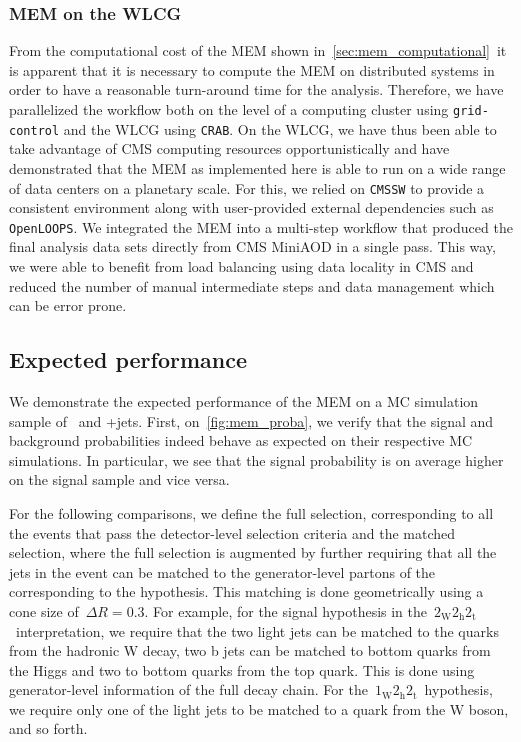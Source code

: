 \subsubsection{MEM on the WLCG}

From the computational cost of the MEM shown in~\cref{sec:mem_computational}~it is apparent that it is necessary to compute the MEM on distributed systems in order to have a reasonable turn-around time for the analysis. Therefore, we have parallelized the workflow both on the level of a computing cluster using \texttt{grid-control} and the WLCG using \texttt{CRAB}. On the WLCG, we have thus been able to take advantage of CMS computing resources opportunistically and have demonstrated that the MEM as implemented here is able to run on a wide range of data centers on a planetary scale. For this, we relied on \texttt{CMSSW} to provide a consistent environment along with user-provided external dependencies such as \texttt{OpenLOOPS}. We integrated the MEM into a multi-step workflow that produced the final analysis data sets directly from CMS MiniAOD in a single pass. This way, we were able to benefit from load balancing using data locality in CMS and reduced the number of manual intermediate steps and data management which can be error prone.

\subsection{Expected performance}
We demonstrate the expected performance of the MEM on a MC simulation sample of \ttH~and \ttbar+jets. First, on~\cref{fig:mem_proba}, we verify that the signal and background probabilities indeed behave as expected on their respective MC simulations. In particular, we see that the signal probability is on average higher on the signal sample and vice versa.

For the following comparisons, we define the full selection, corresponding to all the events that pass the detector-level selection criteria and the matched selection, where the full selection is augmented by further requiring that all the jets in the event can be matched to the generator-level partons of the corresponding to the hypothesis. This matching is done geometrically using a cone size of~$\Delta R = 0.3$. For example, for the signal hypothesis in the~$2_{\mathrm{W}} 2_{\mathrm{h}} 2_{\mathrm{t}}$~interpretation, we require that the two light jets can be matched to the quarks from the hadronic W decay, two b jets can be matched to bottom quarks from the Higgs and two to bottom quarks from the top quark. This is done using generator-level information of the full decay chain. For the~$1_{\mathrm{W}} 2_{\mathrm{h}} 2_{\mathrm{t}}$~hypothesis, we require only one of the light jets to be matched to a quark from the W boson, and so forth.

